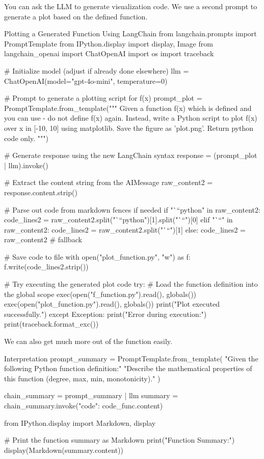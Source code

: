 You can ask the LLM to generate visualization code. We use a second prompt to generate a plot based on the defined function.

\begin{codeonly}{Plotting a Generated Function Using LangChain}
from langchain.prompts import PromptTemplate
from IPython.display import display, Image
from langchain_openai import ChatOpenAI
import os
import traceback

# Initialize model (adjust if already done elsewhere)
llm = ChatOpenAI(model="gpt-4o-mini", temperature=0)

# Prompt to generate a plotting script for f(x)
prompt_plot = PromptTemplate.from_template("""
Given a function f(x) which is defined and you can use - 
do not define f(x) again. Instead, 
write a Python script to plot f(x) over x in [-10, 10] using matplotlib.
Save the figure as 'plot.png'. Return python code only.
""")

# Generate response using the new LangChain syntax
response = (prompt_plot | llm).invoke({})

# Extract the content string from the AIMessage
raw_content2 = response.content.strip()

# Parse out code from markdown fences if needed
if "```python" in raw_content2:
    code_lines2 = raw_content2.split("```python")[1].split("```")[0]
elif "```" in raw_content2:
    code_lines2 = raw_content2.split("```")[1]
else:
    code_lines2 = raw_content2  # fallback

# Save code to file
with open("plot_function.py", "w") as f:
    f.write(code_lines2.strip())

# Try executing the generated plot code
try:
    # Load the function definition into the global scope
    exec(open("f_function.py").read(), globals())
    exec(open("plot_function.py").read(), globals())
    print("Plot executed successfully.")
except Exception:
    print("Error during execution:")
    print(traceback.format_exc())
\end{codeonly}


%
We can also get much more out of the function easily. 

\begin{codeonly}{Interpretation}
prompt_summary = PromptTemplate.from_template(
    "Given the following Python function definition:\n{}\n\n"
    "Describe the mathematical properties of this function (degree, max, min, monotonicity)."
)

chain_summary = prompt_summary | llm
summary = chain_summary.invoke({"code": code_func.content})

from IPython.display import Markdown, display

# Print the function summary as Markdown
print("Function Summary:\n")
display(Markdown(summary.content))
\end{codeonly}

